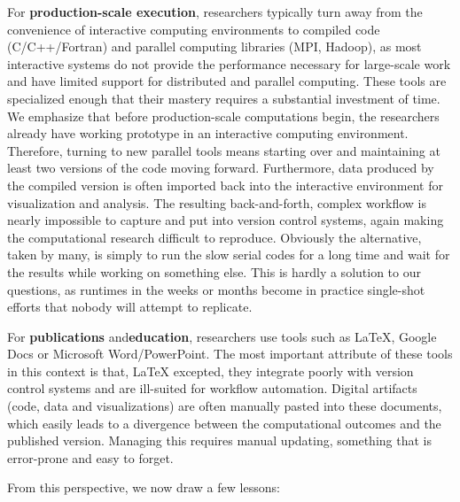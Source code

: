 \documentclass[ChapterTOCs,krantz2]{krantz} %
\begin{document}
For \textbf{production-scale execution}, researchers typically turn away from
the convenience of interactive computing environments to compiled code
(C/C++/Fortran) and parallel computing libraries (MPI, Hadoop), as most
interactive systems do not provide the performance necessary for large-scale
work and have limited support for distributed and parallel computing.  These
tools are specialized enough that their mastery requires a substantial
investment of time. We emphasize that before production-scale computations
begin, the researchers already have working prototype in an interactive
computing environment. Therefore, turning to new parallel tools means starting
over and maintaining at least two versions of the code moving
forward. Furthermore, data produced by the compiled version is often imported
back into the interactive environment for visualization and analysis. The
resulting back-and-forth, complex workflow is nearly impossible to capture and
put into version control systems, again making the computational research
difficult to reproduce.  Obviously the alternative, taken by many, is simply to
run the slow serial codes for a long time and wait for the results while
working on something else.  This is hardly a solution to our questions, as
runtimes in the weeks or months become in practice single-shot efforts that
nobody will attempt to replicate.

For \textbf{publications} and\textbf{education}, researchers use tools such as
\LaTeX, Google Docs or Microsoft Word/PowerPoint.  The most important attribute
of these tools in this context is that, \LaTeX{} excepted, they integrate
poorly with version control systems and are ill-suited for workflow automation.
Digital artifacts (code, data and visualizations) are often manually pasted
into these documents, which easily leads to a divergence between the
computational outcomes and the published version.  Managing this requires
manual updating, something that is error-prone and easy to forget.

From this perspective, we now draw a few lessons:
\end{document}
